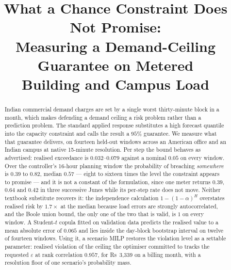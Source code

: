 \documentclass[conference]{IEEEtran}
\newcommand{\rupee}[1]{\textsf{Rs}~#1}
\begin{document}
\title{What a Chance Constraint Does Not Promise:\\
Measuring a Demand-Ceiling Guarantee on Metered\\
Building and Campus Load}

\author{
}

\maketitle

\begin{abstract}
Indian commercial demand charges are set by a single worst thirty-minute block
in a month, which makes defending a demand ceiling a risk problem rather than a
prediction problem. The standard applied response substitutes a high forecast
quantile into the capacity constraint and calls the result a $95\%$ guarantee.
We measure what that guarantee delivers, on fourteen held-out windows across an
American office and an Indian campus at native 15-minute resolution. Per step
the bound behaves as advertised: realised exceedance is $0.032$--$0.079$
against a nominal $0.05$ on every window. Over the controller's 16-hour
planning window the probability of breaching \emph{somewhere} is $0.39$ to
$0.82$, median $0.57$ --- eight to sixteen times the level the constraint
appears to promise --- and it is not a constant of the formulation, since one
meter returns $0.39$, $0.64$ and $0.42$ in three successive Junes while its
per-step rate does not move. Neither textbook substitute recovers it: the
independence calculation $1-(1-\alpha)^{H}$ overstates realised risk by
$1.7\times$ at the median because load errors are strongly autocorrelated, and
the Boole union bound, the only one of the two that is valid, is $1$ on every
window. A Student-$t$ copula fitted on validation data predicts the realised
value to a mean absolute error of $0.065$ and lies inside the day-block
bootstrap interval on twelve of fourteen windows. Using it, a scenario MILP
restores the violation level as a settable parameter: realised violation of the
ceiling the optimiser committed to tracks the requested $\varepsilon$ at rank
correlation $0.957$, for \rupee{3{,}339} on a billing month, with a resolution
floor of one scenario's probability mass.
\end{abstract}
\end{document}
